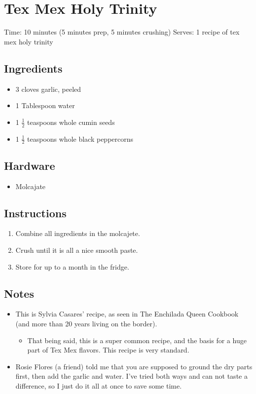 \section{Tex Mex Holy Trinity}
\label{texMexHolyTrinity}
\setcounter{secnumdepth}{0}
Time: 10 minutes (5 minutes prep, 5 minutes crushing)
Serves: 1 recipe of tex mex holy trinity

\begin{multicols}{2}
\subsection*{Ingredients}
\begin{itemize}
	\item 3 cloves garlic, peeled
	\item 1 Tablespoon water
    \item 1 \( \frac{1}{2} \) teaspoons whole cumin seeds
    \item 1 \( \frac{1}{2} \) teaspoons whole black peppercorns
\end{itemize}

\subsection*{Hardware}
\begin{itemize}
    \item Molcajate
\end{itemize}
\clearpage

\subsection*{Instructions}
\begin{enumerate}
    \item Combine all ingredients in the molcajete.
    \item Crush until it is all a nice smooth paste.
    \item Store for up to a month in the fridge.
\end{enumerate}

\subsection*{Notes}
\begin{itemize}
    \item This is Sylvia Casares' recipe, as seen in The Enchilada Queen Cookbook (and more than 20 years living on the border).
    \begin{itemize}
        \item That being said, this is a super common recipe, and the basis for a huge part of Tex Mex flavors. This recipe is very standard.
    \end{itemize}
    \item Rosie Flores (a friend) told me that you are supposed to ground the dry parts first, then add the garlic and water. I've tried both ways and can not taste a difference, so I just do it all at once to save some time.
\end{itemize}
\end{multicols}
\clearpage